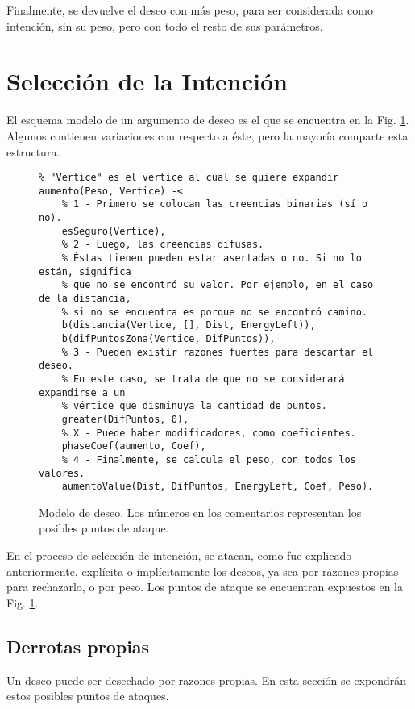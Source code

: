 \documentclass[oneside]{book}
\begin{document}
Finalmente, se devuelve el deseo con más peso, para ser considerada como intención,
sin su peso, pero con todo el resto de sus parámetros. %


\section{Selección de la Intención}

El esquema modelo de un argumento de deseo es el que se encuentra en la Fig. 
\ref{fig:modeloArgumento}. Algunos contienen variaciones con respecto a éste, pero
la mayoría comparte esta estructura.

\begin{figure}
\begin{verbatim}
% "Vertice" es el vertice al cual se quiere expandir
aumento(Peso, Vertice) -< 
    % 1 - Primero se colocan las creencias binarias (sí o no).
    esSeguro(Vertice), 
    % 2 - Luego, las creencias difusas.
    % Éstas tienen pueden estar asertadas o no. Si no lo están, significa
    % que no se encontró su valor. Por ejemplo, en el caso de la distancia,
    % si no se encuentra es porque no se encontró camino.
    b(distancia(Vertice, [], Dist, EnergyLeft)),
    b(difPuntosZona(Vertice, DifPuntos)),
    % 3 - Pueden existir razones fuertes para descartar el deseo.
    % En este caso, se trata de que no se considerará expandirse a un 
    % vértice que disminuya la cantidad de puntos.
    greater(DifPuntos, 0),
    % X - Puede haber modificadores, como coeficientes.
    phaseCoef(aumento, Coef),
    % 4 - Finalmente, se calcula el peso, con todos los valores.
    aumentoValue(Dist, DifPuntos, EnergyLeft, Coef, Peso).
\end{verbatim}
\caption{Modelo de deseo. Los números en los comentarios representan los posibles 
puntos de ataque.}
\label{fig:modeloArgumento}
\end{figure}

En el proceso de selección de intención, se atacan, como fue explicado anteriormente,
explícita o implícitamente los deseos, ya sea por razones propias 
para rechazarlo, o por peso. Los puntos de ataque se encuentran expuestos en la Fig. 
\ref{fig:modeloArgumento}.

\subsection{Derrotas propias}

Un deseo puede ser desechado por razones propias. En esta sección se expondrán estos
posibles puntos de ataques.
\end{document}

